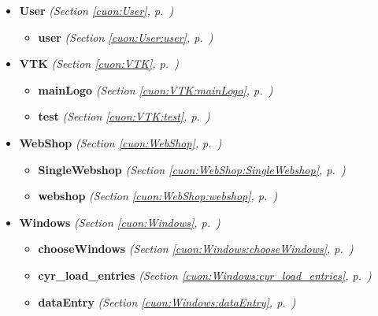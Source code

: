 \begin{itemize}
\begin{itemize}
  \end{itemize}
\item \textbf{User}
  \textit{(Section \ref{cuon:User}, p.~\pageref{cuon:User})}

  \begin{itemize}
\setlength{\parskip}{0ex}
    \item \textbf{user}
  \textit{(Section \ref{cuon:User:user}, p.~\pageref{cuon:User:user})}

  \end{itemize}
\item \textbf{VTK}
  \textit{(Section \ref{cuon:VTK}, p.~\pageref{cuon:VTK})}

  \begin{itemize}
\setlength{\parskip}{0ex}
    \item \textbf{mainLogo}
  \textit{(Section \ref{cuon:VTK:mainLogo}, p.~\pageref{cuon:VTK:mainLogo})}

    \item \textbf{test}
  \textit{(Section \ref{cuon:VTK:test}, p.~\pageref{cuon:VTK:test})}

  \end{itemize}
\item \textbf{WebShop}
  \textit{(Section \ref{cuon:WebShop}, p.~\pageref{cuon:WebShop})}

  \begin{itemize}
\setlength{\parskip}{0ex}
    \item \textbf{SingleWebshop}
  \textit{(Section \ref{cuon:WebShop:SingleWebshop}, p.~\pageref{cuon:WebShop:SingleWebshop})}

    \item \textbf{webshop}
  \textit{(Section \ref{cuon:WebShop:webshop}, p.~\pageref{cuon:WebShop:webshop})}

  \end{itemize}
\item \textbf{Windows}
  \textit{(Section \ref{cuon:Windows}, p.~\pageref{cuon:Windows})}

  \begin{itemize}
\setlength{\parskip}{0ex}
    \item \textbf{chooseWindows}
  \textit{(Section \ref{cuon:Windows:chooseWindows}, p.~\pageref{cuon:Windows:chooseWindows})}

    \item \textbf{cyr\_load\_entries}
  \textit{(Section \ref{cuon:Windows:cyr_load_entries}, p.~\pageref{cuon:Windows:cyr_load_entries})}

    \item \textbf{dataEntry}
  \textit{(Section \ref{cuon:Windows:dataEntry}, p.~\pageref{cuon:Windows:dataEntry})}


\end{itemize}
\end{itemize}

